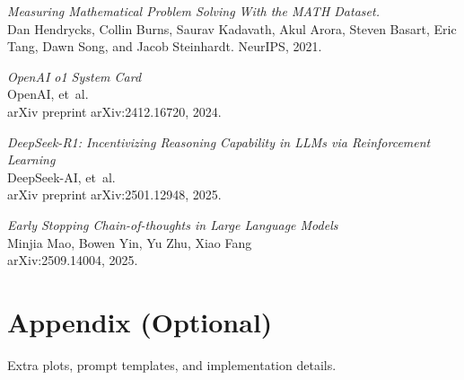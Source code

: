 \documentclass[10pt,a4paper,twocolumn]{article}
\begin{document}
\vspace{-2mm}
\begingroup
\small
\begin{thebibliography}{9}

\textit{Measuring Mathematical Problem Solving With the MATH Dataset.}  \\
Dan Hendrycks, Collin Burns, Saurav Kadavath, Akul Arora, Steven Basart, Eric Tang, Dawn Song, and Jacob Steinhardt.  
NeurIPS, 2021.

\textit{OpenAI o1 System Card}  \\
OpenAI, et~al. \\
arXiv preprint arXiv:2412.16720, 2024.  

\textit{DeepSeek-R1: Incentivizing Reasoning Capability in LLMs via Reinforcement Learning}  \\
DeepSeek-AI, et~al. \\
arXiv preprint arXiv:2501.12948, 2025.

\textit{Early Stopping Chain-of-thoughts in Large Language Models} \\ 
Minjia Mao, Bowen Yin, Yu Zhu, Xiao Fang \\
arXiv:2509.14004, 2025.


\end{thebibliography}

\endgroup

\appendix
\section*{Appendix (Optional)}
Extra plots, prompt templates, and implementation details.
\end{document}
